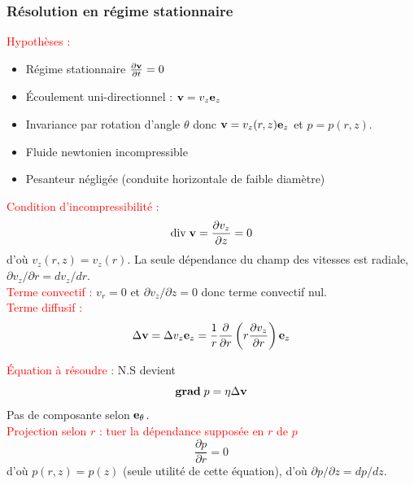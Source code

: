 \documentclass[11pt,a4paper]{report}
\begin{document}
\subsubsection{Résolution en régime stationnaire}

\textcolor{red}{Hypothèses :}
\begin{itemize}
	\item Régime stationnaire $\frac{\partial \bold{v}}{\partial t} = 0$
	\item \'Ecoulement uni-directionnel : $\bold{v} = v_z \bold{e}_z$
	\item Invariance par rotation d'angle $\theta$ donc $\bold{v} = v_z(r,z) \bold{e}_z$ et $p = p(r,z)$.
	\item Fluide newtonien incompressible\\
	\item Pesanteur négligée (conduite horizontale de faible diamètre)\\ 
\end{itemize}

\textcolor{red}{Condition d'incompressibilité :}
\begin{equation}
	\text{div}\;\bold{v} = \frac{\partial v_z}{\partial z} = 0
\end{equation}
d'où $v_z(r,z) = v_z(r)$. La seule dépendance du champ des vitesses est radiale, $\partial v_z/\partial r = dv_z/dr$.\\

\textcolor{red}{Terme convectif :}
$v_r = 0$ et $\partial v_z/\partial z = 0$ donc terme convectif nul.\\

\textcolor{red}{Terme diffusif :}
\begin{equation}
	\Delta \bold{v} = \Delta v_z \bold{e}_z = \frac{1}{r}\frac{\partial}{\partial r}\left(r \frac{\partial v_z}{\partial r}\right) \bold{e}_z\\
\end{equation}

\textcolor{red}{\'Equation à résoudre :} N.S devient
\begin{equation}
	\textbf{grad}\;p = \eta \Delta \bold{v}
\end{equation}
Pas de composante selon $\bold{e}_{\theta}$.\\


\textcolor{red}{Projection selon $r$ : tuer la dépendance supposée en $r$ de $p$}
\begin{equation}
	\frac{\partial p}{\partial r} = 0
\end{equation}
d'où $p(r,z) = p(z)$ (seule utilité de cette équation), d'où $\partial p/\partial z = dp/dz$.\\
\end{document}
